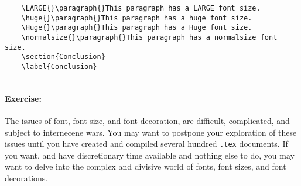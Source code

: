 \begin{verbatim}
    \LARGE{}\paragraph{}This paragraph has a LARGE font size.
    \huge{}\paragraph{}This paragraph has a huge font size.
    \Huge{}\paragraph{}This paragraph has a Huge font size.
    \normalsize{}\paragraph{}This paragraph has a normalsize font size.
    \section{Conclusion}
    \label{Conclusion}
    
        \end{verbatim}

        \paragraph{Exercise:} The issues of font, font size, and font decoration, are difficult, complicated, and subject to internecene wars. You may want to postpone your exploration of these issues until you have created and compiled several hundred \texttt{.tex} documents. If you want, and have discretionary time available and nothing else to do, you may want to delve into the complex and divisive world of fonts, font sizes, and font decorations.

